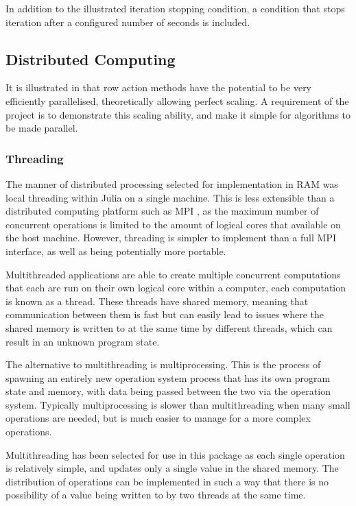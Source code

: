 In addition to the illustrated iteration stopping condition, a condition that stops iteration after a configured number of seconds is included.

\subsection{Distributed Computing}\label{sub:hildreth_threaded}
It is illustrated in \cite{Liu2014AnAlgorithm} that row action methods have the potential to be very efficiently parallelised, theoretically allowing perfect scaling. A requirement of the project is to demonstrate this scaling ability, and make it simple for algorithms to be made parallel.

\subsubsection{Threading}

The manner of distributed processing selected for implementation in RAM was local threading within Julia on a single machine. This is less extensible than a distributed computing platform such as MPI \cite{MPIForum}, as the maximum number of concurrent operations is limited to the amount of logical cores that available on the host machine. However, threading is simpler to implement than a full MPI interface, as well as being potentially more portable. 

Multithreaded applications are able to create multiple concurrent computations that each are run on their own logical core within a computer, each computation is known as a thread. These threads have shared memory, meaning that communication between them is fast but can easily lead to issues where the shared memory is written to at the same time by different threads, which can result in an unknown program state.

The alternative to multithreading is multiprocessing. This is the process of spawning an entirely new operation system process that has its own program state and memory, with data being passed between the two via the operation system. Typically multiprocessing is slower than multithreading when many small operations are needed, but is much easier to manage for a more complex operations. 

Multithreading has been selected for use in this package as each single operation is relatively simple, and updates only a single value in the shared memory. The distribution of operations can be implemented in such a way that there is no possibility of a value being written to by two threads at the same time. 

